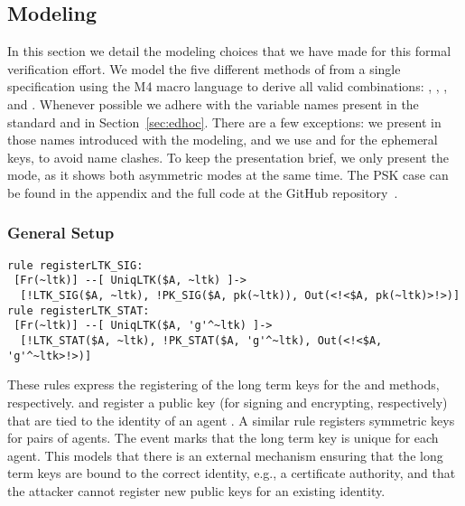  
\subsection{Modeling \mEdhoc{}}
 
In this section we detail the modeling choices that we have made for this formal
verification effort.
%
We model the five different methods of \mEdhoc{} from a single specification
using the M4 macro language to derive all valid combinations: \mPskPsk,
\mSigSig, \mSigStat, \mStatSig{} and \mStatStat.
%
Whenever possible we adhere with the variable names present in the standard and
in Section~\ref{sec:edhoc}. There are a few exceptions: we present in
 those names introduced with the modeling, and we use  and
 for the ephemeral keys, to avoid name clashes.
%
%
To keep the presentation brief, we only present the \mStatSig{} mode, as it
shows both asymmetric modes at the same time. The PSK case can be found in the
appendix and the full code at the GitHub repository~\cite{edhocTamarinRepo}.
 
\subsubsection{General Setup}
\begin{lstlisting}
rule registerLTK_SIG:
 [Fr(~ltk)] --[ UniqLTK($A, ~ltk) ]->
  [!LTK_SIG($A, ~ltk), !PK_SIG($A, pk(~ltk)), Out(<!<$A, pk(~ltk)>!>)]
rule registerLTK_STAT:
 [Fr(~ltk)] --[ UniqLTK($A, 'g'^~ltk) ]->
  [!LTK_STAT($A, ~ltk), !PK_STAT($A, 'g'^~ltk), Out(<!<$A, 'g'^~ltk>!>)]
\end{lstlisting}

These rules express the registering of the long term keys for the \mSig{} and
\mStat{} methods, respectively.
%
 and  register a public key (for
signing and encrypting, respectively) that are tied to the identity of an agent
. A similar rule  registers symmetric keys for pairs
of agents.
%
The event  marks that the long term key is unique for each
agent.
This models that there is an external mechanism ensuring that the
long term keys are bound to the correct identity, e.g., a certificate authority,
and that the attacker cannot register new public keys for an existing identity.

